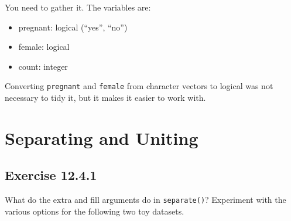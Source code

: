 \documentclass[]{book}
\newenvironment{Shaded}{\begin{snugshade}}{\end{snugshade}}
\newcommand{\CommentTok}[1]{\textcolor[rgb]{0.56,0.35,0.01}{\textit{#1}}}
\newcommand{\DataTypeTok}[1]{\textcolor[rgb]{0.13,0.29,0.53}{#1}}
\newcommand{\KeywordTok}[1]{\textcolor[rgb]{0.13,0.29,0.53}{\textbf{#1}}}
\newcommand{\NormalTok}[1]{#1}
\newcommand{\OperatorTok}[1]{\textcolor[rgb]{0.81,0.36,0.00}{\textbf{#1}}}
\newcommand{\StringTok}[1]{\textcolor[rgb]{0.31,0.60,0.02}{#1}}
\providecommand{\tightlist}{%
  \setlength{\itemsep}{0pt}\setlength{\parskip}{0pt}}
\theoremstyle{plain}
\theoremstyle{remark}
\theoremstyle{definition}
\theoremstyle{definition}
\theoremstyle{definition}
\theoremstyle{remark}
\begin{document}
You need to gather it. The variables are:

\begin{itemize}
\tightlist
\item
  pregnant: logical (``yes'', ``no'')
\item
  female: logical
\item
  count: integer
\end{itemize}

\begin{Shaded}
\end{Shaded}

Converting \texttt{pregnant} and \texttt{female} from character vectors
to logical was not necessary to tidy it, but it makes it easier to work
with.

\hypertarget{separating-and-uniting}{%
\section{Separating and Uniting}\label{separating-and-uniting}}

\hypertarget{exercise-12.4.1}{%
\subsection*{\texorpdfstring{Exercise
{12.4.1}}{Exercise 12.4.1}}\label{exercise-12.4.1}}

What do the extra and fill arguments do in \texttt{separate()}?
Experiment with the various options for the following two toy datasets.
\end{document}
